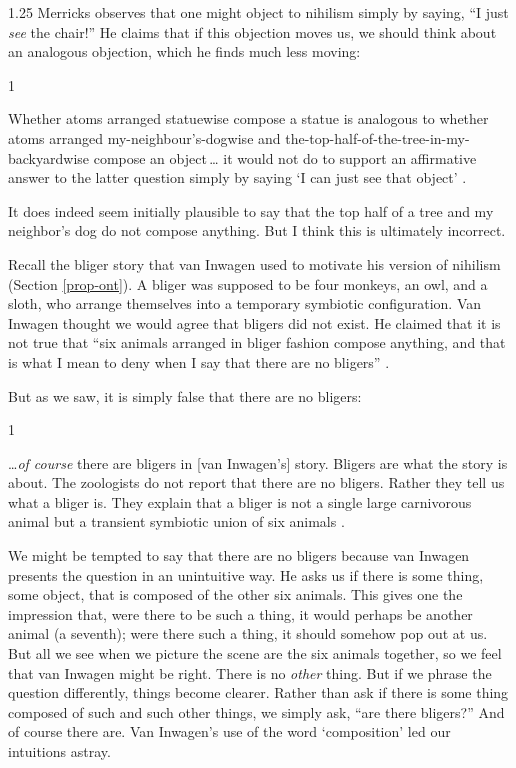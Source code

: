 \documentclass[11pt]{article}
\newenvironment{squote}{%
\begin{spacing}{1}
       	\begin{list}{}{%
\setlength{\labelwidth}{0pt}%
\rightmargin\leftmargin%
}
\item\relax
}{%
\end{list}%
\end{spacing}
}
\begin{document}
\begin{spacing}{1.25}
Merricks observes that one might object to nihilism simply by saying,
``I just {\em see} the chair!''  He claims that if this objection
moves us, we should think about an analogous objection, which he finds
much less moving:

\begin{squote}
Whether atoms arranged statuewise compose a statue is analogous to
whether atoms arranged my-neighbour's-dogwise and
the-top-half-of-the-tree-in-my-backyardwise compose an object\,\ldots
it would not do to support an affirmative answer to the latter
question simply by saying `I can just see that object'
\citeyearpar[73]{merricks2001a}.
\end{squote}

It does indeed seem initially plausible to say that the top half of a
tree and my neighbor's dog do not compose anything.  But I think this
is ultimately incorrect.

Recall the bliger story that van Inwagen used to motivate his version
of nihilism (Section \ref{prop-ont}).  A bliger was supposed to be
four monkeys, an owl, and a sloth, who arrange themselves into a
temporary symbiotic configuration.  Van Inwagen thought we would agree
that bligers did not exist.  He claimed that it is not true that ``six
animals arranged in bliger fashion compose anything, and that is what
I mean to deny when I say that there are no bligers''
\citeyearpar[104]{inwagen1995}.

But as we saw, it is simply false that there are no bligers:

\begin{squote}
\ldots {\em of course} there are bligers in [van Inwagen's] story.
Bligers are what the story is about.  The zoologists do not report
that there are no bligers.  Rather they tell us what a bliger is.
They explain that a bliger is not a single large carnivorous animal
but a transient symbiotic union of six animals
\citep[704]{rosenberg1993}.
\end{squote}

We might be tempted to say that there are no bligers because van
Inwagen presents the question in an unintuitive way.  He asks us if
there is some thing, some object, that is composed of the other six
animals.  This gives one the impression that, were there to be such a
thing, it would perhaps be another animal (a seventh); were there such
a thing, it should somehow pop out at us.  But all we see when we
picture the scene are the six animals together, so we feel that van
Inwagen might be right.  There is no {\em other} thing.  But if we
phrase the question differently, things become clearer.  Rather than
ask if there is some thing composed of such and such other things, we
simply ask, ``are there bligers?''  And of course there are.  Van
Inwagen's use of the word `composition' led our intuitions astray.


\end{spacing}
\end{document}
